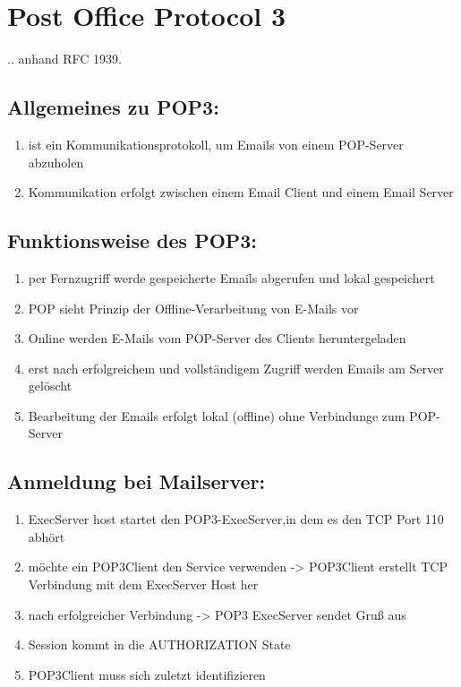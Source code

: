 \documentclass[11pt]{article}
\begin{document}
    \section{Post Office Protocol 3}
    .. anhand RFC 1939.

    \subsection{Allgemeines zu POP3:}
    \begin{enumerate}

        \item ist ein Kommunikationsprotokoll, um Emails von einem POP-Server abzuholen
        \item Kommunikation erfolgt zwischen einem Email Client und einem Email Server

    \end{enumerate}

    \subsection{Funktionsweise des POP3:}

    \begin{enumerate}

        \item per Fernzugriff werde gespeicherte Emails abgerufen und lokal gespeichert
        \item POP sieht Prinzip der Offline-Verarbeitung von E-Mails vor
        \item Online werden E-Mails vom POP-Server des Clients heruntergeladen
        \item erst nach erfolgreichem und vollständigem Zugriff werden Emails am Server gelöscht
        \item Bearbeitung der Emails erfolgt lokal (offline) ohne Verbindunge zum POP-Server

    \end{enumerate}

    \subsection{Anmeldung bei Mailserver:}
    \begin{enumerate}

        \item ExecServer host startet den POP3-ExecServer,in dem es den TCP Port 110 abhört
        \item möchte ein POP3Client den Service verwenden -> POP3Client erstellt TCP
        Verbindung mit dem ExecServer Host her
        \item nach erfolgreicher Verbindung -> POP3 ExecServer sendet Gruß aus
        \item Session kommt in die AUTHORIZATION State
        \item POP3Client muss sich zuletzt identifizieren

    \end{enumerate}
\end{document}
